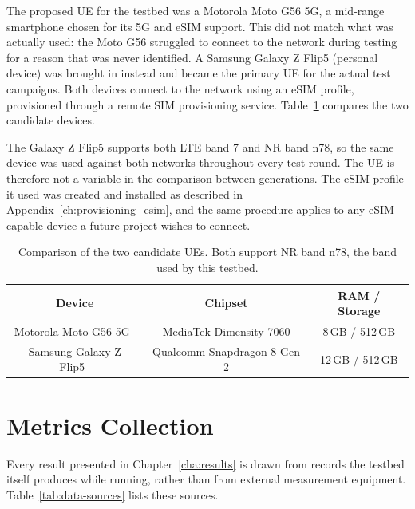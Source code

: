The proposed \gls{UE} for the testbed was a Motorola Moto G56 5G, a mid-range smartphone chosen for its 5G and eSIM support. This did not match what was actually used: the Moto G56 struggled to connect to the network during testing for a reason that was never identified. A Samsung Galaxy Z Flip5 (personal device) was brought in instead and became the primary \gls{UE} for the actual test campaigns. Both devices connect to the network using an eSIM profile, provisioned through a remote SIM provisioning service. Table~\ref{tab:ue-comparison} compares the two candidate devices.

The Galaxy Z Flip5 supports both \gls{LTE} band 7 and \gls{NR} band n78, so the same device was used against both networks throughout every test round. The \gls{UE} is therefore not a variable in the comparison between generations. The eSIM profile it used was created and installed as described in Appendix~\ref{ch:provisioning_esim}, and the same procedure applies to any eSIM-capable device a future project wishes to connect.

\begin{table}[htbp]
    \centering
    \begin{tabular}{|c|c|c|}
        \hline
        \textbf{Device} & \textbf{Chipset} & \textbf{RAM / Storage}\\
        \hline
        Motorola Moto G56 5G~\cite{gsmarena_moto_g56} & MediaTek Dimensity 7060 & 8\,GB / 512\,GB\\
        \hline
        Samsung Galaxy Z Flip5~\cite{gsmarena_z_flip5} & Qualcomm Snapdragon 8 Gen 2 & 12\,GB / 512\,GB \\
        \hline
    \end{tabular}
    \caption[Comparison of the two candidate UEs.]{Comparison of the two candidate \glspl{UE}. Both support \gls{NR} band n78, the band used by this testbed.}
    \label{tab:ue-comparison}
\end{table}

\section{Metrics Collection}
\label{sec:data-collection}

Every result presented in Chapter~\ref{cha:results} is drawn from records the testbed itself produces while running, rather than from external measurement equipment. Table~\ref{tab:data-sources} lists these sources.

